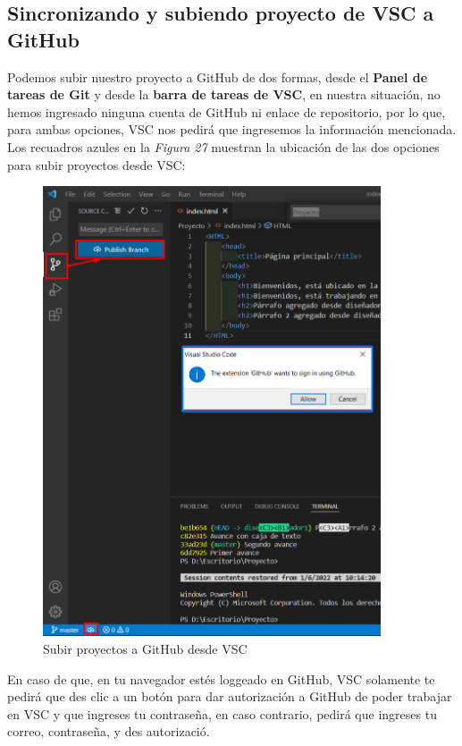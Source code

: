 \subsection{Sincronizando y subiendo proyecto de VSC a GitHub}
\hspace{0.55cm}Podemos subir nuestro proyecto a GitHub de dos formas, desde el \textbf{Panel de tareas de Git} y desde la \textbf{barra de tareas de VSC}, en nuestra situación, no hemos ingresado ninguna cuenta de GitHub ni enlace de repositorio, por lo que, para ambas opciones, VSC nos pedirá que ingresemos la información mencionada. Los recuadros azules en la \textit{Figura 27} muestran la ubicación de las dos opciones para subir proyectos desde VSC:
\begin{figure}[H]
    \begin{center}
        \caption{Subir proyectos a GitHub desde VSC}
        \label{fig: 27}
        \includegraphics[width=10cm]{capturas/subir_proyecto1.png}
    \end{center}
\end{figure}

En caso de que, en tu navegador estés loggeado en GitHub, VSC solamente te pedirá que des clic a un botón para dar autorización a GitHub de poder trabajar en VSC y que ingreses tu contraseña, en caso contrario, pedirá que ingreses tu correo, contraseña, y des autorizació.

